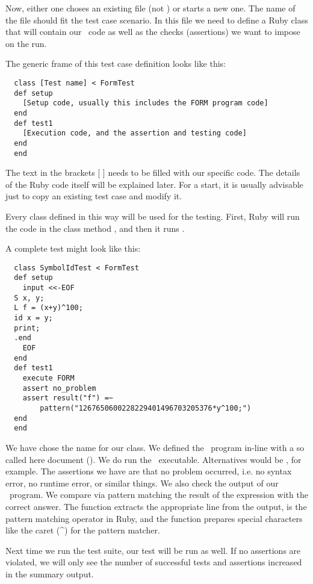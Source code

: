 Now, either one choses an existing  file (not ) or starts a
new one. The name of the file should fit the test case scenario. In this file we
need to define a Ruby class that will contain our \FORM\ code as well as the
checks (assertions) we want to impose on the run.

The generic frame of this test case definition looks like this:

\begin{verbatim}
  class [Test name] < FormTest
  def setup
    [Setup code, usually this includes the FORM program code]
  end
  def test1
    [Execution code, and the assertion and testing code]
  end
  end
\end{verbatim}

The text in the brackets [ ] needs to be filled with our specific code. The
details of the Ruby code itself will be explained later. For a start, it is
usually advisable just to copy an existing test case and modify it.

Every class defined in this way will be used for the testing. First, Ruby will
run the code in the class method , and then it runs .

A complete test might look like this:

\begin{verbatim}
  class SymbolIdTest < FormTest
  def setup
    input <<-EOF
  S x, y;
  L f = (x+y)^100;
  id x = y;
  print;
  .end
    EOF
  end
  def test1
    execute FORM
    assert no_problem
    assert result("f") =~ 
        pattern("1267650600228229401496703205376*y^100;")
  end
  end
\end{verbatim}

We have chose the name  for our class. We defined the \FORM\
program in-line with a so called here document (). We do run
the \FORM\ executable. Alternatives would be \TFORM, for example. The assertions
we have are that no problem occurred, i.e. no syntax error, no runtime error, or
similar things. We also check the output of our \FORM\ program. We compare via
pattern matching the result of the expression \C{f} with the correct answer. The
function \C{result()} extracts the appropriate line from the output, \C{=\~{}} is
the pattern matching operator in Ruby, and the function \C{pattern()} prepares
special characters like the caret (\^{}) for the pattern matcher.

Next time we run the test suite, our test will be run as well. If no assertions
are violated, we will only see the number of successful tests and assertions
increased in the summary output.

